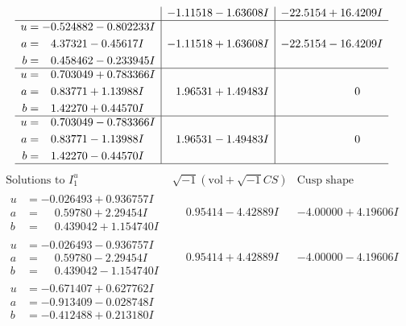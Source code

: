 \documentclass[1p]{elsarticle_modified}
\theoremstyle{definition}
\newcommand{\I}{\sqrt{-1}}
\begin{document}
$$\begin{array}{c|c|c}
 & -1.11518 - 1.63608 I & -22.5154 + 16.4209 I \\ \hline\begin{aligned}
u &= -0.524882 - 0.802233 I \\
a &= \phantom{-}4.37321 - 0.45617 I \\
b &= \phantom{-}0.458462 - 0.233945 I\end{aligned}
 & -1.11518 + 1.63608 I & -22.5154 - 16.4209 I \\ \hline\begin{aligned}
u &= \phantom{-}0.703049 + 0.783366 I \\
a &= \phantom{-}0.83771 + 1.13988 I \\
b &= \phantom{-}1.42270 + 0.44570 I\end{aligned}
 & \phantom{-}1.96531 + 1.49483 I & \phantom{-0.000000 } 0 \\ \hline\begin{aligned}
u &= \phantom{-}0.703049 - 0.783366 I \\
a &= \phantom{-}0.83771 - 1.13988 I \\
b &= \phantom{-}1.42270 - 0.44570 I\end{aligned}
 & \phantom{-}1.96531 - 1.49483 I & \phantom{-0.000000 } 0\\
 \hline 
 \end{array}$$\newpage$$\begin{array}{c|c|c}  
\text{Solutions to }I^u_{1}& \I (\text{vol} + \sqrt{-1}CS) & \text{Cusp shape}\\
 \hline 
\begin{aligned}
u &= -0.026493 + 0.936757 I \\
a &= \phantom{-}0.59780 + 2.29454 I \\
b &= \phantom{-}0.439042 + 1.154740 I\end{aligned}
 & \phantom{-}0.95414 - 4.42889 I & -4.00000 + 4.19606 I \\ \hline\begin{aligned}
u &= -0.026493 - 0.936757 I \\
a &= \phantom{-}0.59780 - 2.29454 I \\
b &= \phantom{-}0.439042 - 1.154740 I\end{aligned}
 & \phantom{-}0.95414 + 4.42889 I & -4.00000 - 4.19606 I \\ \hline\begin{aligned}
u &= -0.671407 + 0.627762 I \\
a &= -0.913409 - 0.028748 I \\
b &= -0.412488 + 0.213180 I\end{aligned}

\end{array}$$
\end{document}
